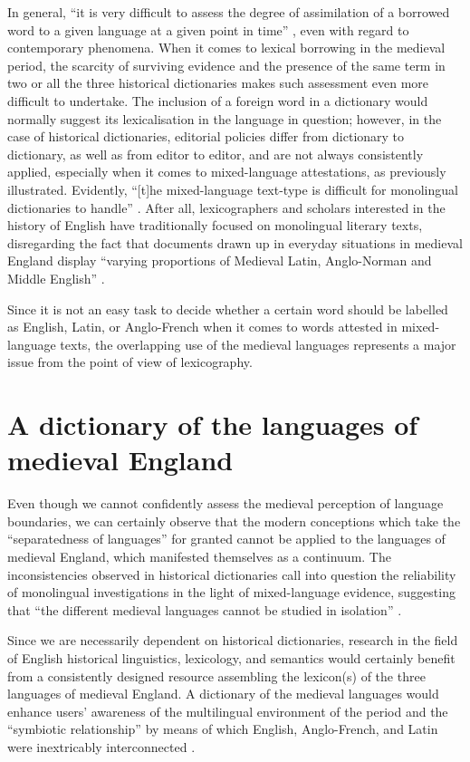 \documentclass[output=paper,colorlinks,citecolor=brown,arabicfont,chinesefont]{langscibook}
\begin{document}
In general, “it is very difficult to assess the degree of assimilation of a borrowed word to a given language at a given point in time” \citep[155]{Wright2000}, even with regard to contemporary phenomena. When it comes to lexical borrowing in the medieval period, the scarcity of surviving evidence and the presence of the same term in two or all the three historical dictionaries makes such assessment even more difficult to undertake. The inclusion of a foreign word in a dictionary would normally suggest its lexicalisation in the language in question; however, in the case of historical dictionaries, editorial policies differ from dictionary to dictionary, as well as from editor to editor, and are not always consistently applied, especially when it comes to mixed-language attestations, as previously illustrated. Evidently, “[t]he mixed-language text-type is difficult for monolingual dictionaries to handle” \citep[131]{Wright2013b}. After all, lexicographers and scholars interested in the history of English have traditionally focused on monolingual literary texts, disregarding the fact that documents drawn up in everyday situations in medieval England display “varying proportions of Medieval Latin, Anglo-Norman and Middle English” \citep[5]{Wright2020a}.

Since it is not an easy task to decide whether a certain word should be labelled as English, Latin, or Anglo-French when it comes to words attested in mixed-language texts, the overlapping use of the medieval languages represents a major issue from the point of view of lexicography.

\section{A dictionary of the languages of medieval England}

Even though we cannot confidently assess the medieval perception of language boundaries, we can certainly observe that the modern conceptions which take the “separatedness of languages” for granted \citep[155]{Trotter2009} cannot be applied to the languages of medieval England, which manifested themselves as a continuum. The inconsistencies observed in historical dictionaries call into question the reliability of monolingual investigations in the light of mixed-language evidence, suggesting that “the different medieval languages cannot be studied in isolation” \citep[15]{Schendl2015}.

Since we are necessarily dependent on historical dictionaries, research in the field of English historical linguistics, lexicology, and semantics would certainly benefit from a consistently designed resource assembling the lexicon(s) of the three languages of medieval England. A dictionary of the medieval languages would enhance users’ awareness of the multilingual environment of the period and the “symbiotic relationship” by means of which English, Anglo-French, and Latin were inextricably interconnected \citep[181]{Turville-petre1996}.
\end{document}
